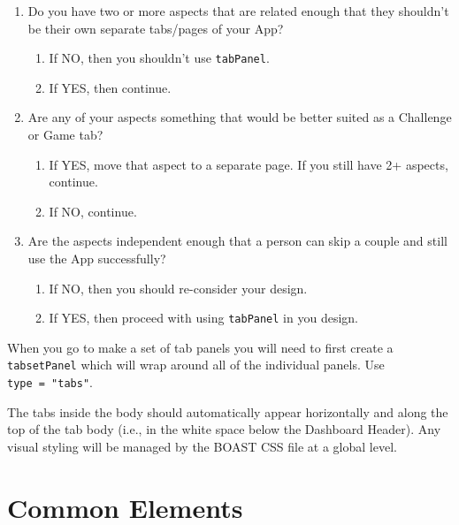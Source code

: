 \documentclass[
]{book}
\providecommand{\tightlist}{%
  \setlength{\itemsep}{0pt}\setlength{\parskip}{0pt}}
\begin{document}
\begin{enumerate}
\def\labelenumi{\arabic{enumi}.}
\tightlist
\item
  Do you have two or more aspects that are related enough that they shouldn't be their own separate tabs/pages of your App?

  \begin{enumerate}
  \def\labelenumii{\alph{enumii}.}
  \tightlist
  \item
    If NO, then you shouldn't use \texttt{tabPanel}.\\
  \item
    If YES, then continue.
  \end{enumerate}
\item
  Are any of your aspects something that would be better suited as a Challenge or Game tab?

  \begin{enumerate}
  \def\labelenumii{\alph{enumii}.}
  \tightlist
  \item
    If YES, move that aspect to a separate page. If you still have 2+ aspects, continue.\\
  \item
    If NO, continue.\\
  \end{enumerate}
\item
  Are the aspects independent enough that a person can skip a couple and still use the App successfully?

  \begin{enumerate}
  \def\labelenumii{\alph{enumii}.}
  \tightlist
  \item
    If NO, then you should re-consider your design.\\
  \item
    If YES, then proceed with using \texttt{tabPanel} in you design.
  \end{enumerate}
\end{enumerate}

When you go to make a set of tab panels you will need to first create a \texttt{tabsetPanel} which will wrap around all of the individual panels. Use \texttt{type\ =\ "tabs"}.

The tabs inside the body should automatically appear horizontally and along the top of the tab body (i.e., in the white space below the Dashboard Header). Any visual styling will be managed by the BOAST CSS file at a global level.

\hypertarget{common-elements}{%
\section{Common Elements}\label{common-elements}}
\end{document}
